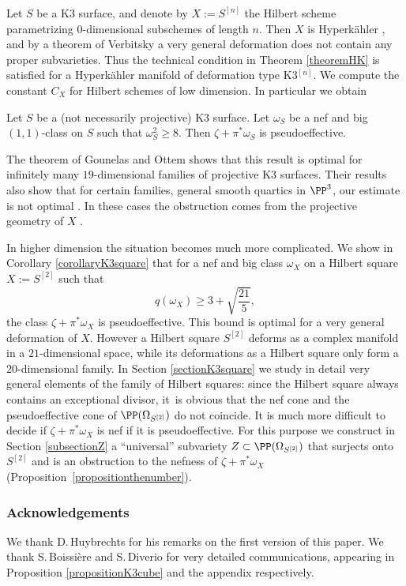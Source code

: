 Let $S$ be a K3 surface, and denote by $X:=S^{[n]}$ the Hilbert scheme parametrizing $0$-dimensional subschemes
of length $n$. Then $X$ is Hyperkähler \cite{Bea83}, and by a theorem of Verbitsky
\cite[Th.\,1.1]{Ver98} a very general deformation does not contain any proper subvarieties.
Thus the technical condition in Theorem \ref{theoremHK} is satisfied for a Hyperkähler manifold of deformation type K3$^{[n]}$.
We compute the constant $C_X$ for Hilbert schemes of low dimension. In particular we obtain

\begin{corollary} \label{corollaryK3surface}
Let $S$ be a (not necessarily projective) K3 surface.
Let $\omega_S$ be a nef and big $(1,1)$-class on $S$ such that $\omega_S^2 \geq 8$.
Then $\zeta+\pi^*\omega_S$ is pseudoeffective.
\end{corollary}

The theorem of Gounelas and Ottem shows that this result is optimal for infinitely many $19$-dimensional families of projective K3 surfaces. Their results also show that for certain families, \eg general smooth quartics in $\PP^3$, our estimate is not optimal \cite[Cor.\,4.2]{GO18}. In these cases the obstruction comes from the projective geometry of $X$ \cite[\S 4.2]{GO18}.

In higher dimension the situation becomes much more complicated. We show in
Corollary \ref{corollaryK3square} that for a nef and big class $\omega_X$ on a Hilbert square $X:=S^{[2]}$
such that
\[
q(\omega_X)\geq 3+\sqrt{\frac{21}{5}},
\]
the class $\zeta+\pi^*\omega_X$ is pseudoeffective. This bound is optimal
for a very general defor\-ma\-tion of $X$. However a Hilbert square $S^{[2]}$ deforms as a complex manifold in a
$21$\nobreakdash-dimensional space, while its deformations as a Hilbert square only form a $20$\nobreakdash-dimen\-sional family.
In Section \ref{sectionK3square} we study in detail very general elements of the family of Hilbert squares:
since the Hilbert square always contains an exceptional divisor, it~is obvious
that the nef cone and the pseudoeffective cone of $\PP(\Omega_{S^{[2]}})$ do not coincide.
It is much more difficult to decide if $\zeta+\pi^* \omega_X$ is nef if it is pseudoeffective.
For this purpose we construct in Section \ref{subsectionZ} a ``universal''
subvariety $Z \subset \PP(\Omega_{S^{[2]}})$ that surjects onto~$S^{[2]}$ and is an obstruction
to the nefness of $\zeta+\pi^* \omega_X$ (\cf Proposition~\ref{propositionthenumber}).

\subsubsection*{Acknowledgements}
We thank D.\,Huybrechts for his remarks on the first version of this paper.
We thank S.\,Boissière and S.\,Diverio for very detailed communications, appearing in Proposition \ref{propositionK3cube}
and the appendix respectively.


